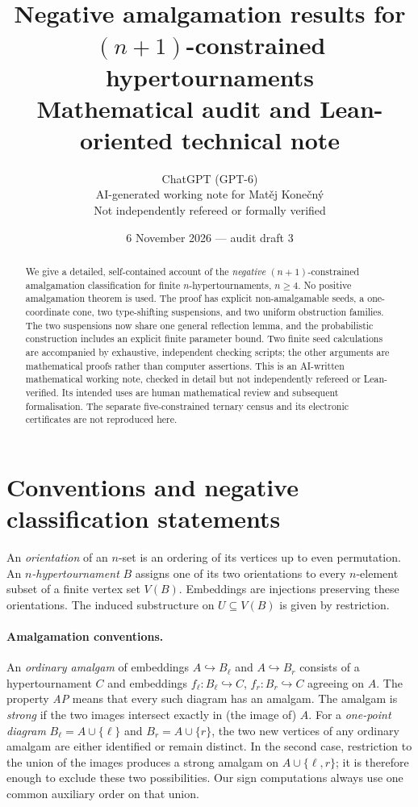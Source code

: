 \documentclass[11pt,a4paper]{article}
\title{Negative amalgamation results for $(n+1)$-constrained hypertournaments\\\large Mathematical audit and Lean-oriented technical note}
\author{ChatGPT (GPT-6)\\\small AI-generated working note for Mat\v ej Kone\v cn\'y\\\small Not independently refereed or formally verified}
\date{6 November 2026 --- audit draft 3}
\theoremstyle{remark}
\begin{document}
\maketitle
\begin{abstract}
We give a detailed, self-contained account of the \emph{negative}
$(n+1)$-constrained amalgamation classification for finite
$n$-hypertournaments, $n\ge4$. No positive amalgamation theorem is used.
The proof has explicit non-amalgamable seeds, a one-coordinate cone,
two type-shifting suspensions, and two uniform obstruction families.
The two suspensions now share one general reflection lemma, and the
probabilistic construction includes an explicit finite parameter bound.
Two finite seed calculations are accompanied by exhaustive, independent
checking scripts; the other arguments are mathematical proofs rather
than computer assertions.
This is an AI-written mathematical working note, checked in detail but
not independently refereed or Lean-verified. Its intended uses are
human mathematical review and subsequent formalisation. The separate
five-constrained ternary census and its electronic certificates are
not reproduced here.
\end{abstract}
\tableofcontents

\section{Conventions and negative classification statements}\label{sec:statement}
An \emph{orientation} of an $n$-set is an ordering of its vertices
up to even permutation. An \emph{$n$-hypertournament} $B$ assigns one
of its two orientations to every $n$-element subset of a finite vertex
set $V(B)$. Embeddings are injections preserving these orientations.
The induced substructure on $U\subseteq V(B)$ is given by restriction.

\paragraph{Amalgamation conventions.}
An \emph{ordinary amalgam} of embeddings $A\hookrightarrow B_\ell$
and $A\hookrightarrow B_r$ consists of a hypertournament $C$ and
embeddings $f_\ell:B_\ell\hookrightarrow C$,
$f_r:B_r\hookrightarrow C$ agreeing on $A$.
The property \emph{AP} means that every such diagram has an amalgam.
The amalgam is \emph{strong} if the two images intersect exactly in
(the image of) $A$. For a \emph{one-point diagram}
$B_\ell=A\cup\{\ell\}$ and $B_r=A\cup\{r\}$, the two new
vertices of any ordinary amalgam are either identified or remain
distinct. In the second case, restriction to the union of the images
produces a strong amalgam on $A\cup\{\ell,r\}$; it is therefore
enough to exclude these two possibilities. Our sign computations
always use one common auxiliary order on that union.
\end{document}
